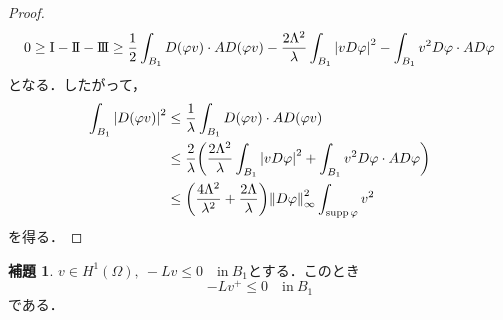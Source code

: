 \documentclass[a4paper]{ltjsarticle}
\newcommand{\Om}{\Omega}
\newcommand{\inn}{\quad\text{in}\ }
\newcommand{\one}{\mathrm{I}}
\newcommand{\two}{\mathrm{I}\hspace{-1.2pt}\mathrm{I}}
\newcommand{\three}{\mathrm{I}\hspace{-1.2pt}\mathrm{I}\hspace{-1.2pt}\mathrm{I}}
\newcommand{\1}{\mathbbm{1}}
\DeclareMathOperator{\supp}{\mathrm{supp}}
\numberwithin{equation}{section}
\theoremstyle{definition}
\newtheorem{lem}[thm]{補題}
\begin{document}
\begin{proof}
\begin{equation}
        0\geq \one-\two-\three\geq \frac{1}{2}\int_{B_1}D(\varphi v)\cdot AD(\varphi v)-\frac{2\Lambda^2}{\lambda}\int_{B_1}\abs{vD\varphi}^2-\int_{B_1}v^2D\varphi\cdot AD\varphi
    \end{equation}
    となる．したがって，
    \begin{align}
        \int_{B_1}\abs{D(\varphi v)}^2&\leq \frac{1}{\lambda}\int_{B_1}D(\varphi v)\cdot AD(\varphi v)\\
        &\leq \frac{2}{\lambda}\qty(\frac{2\Lambda^2}{\lambda}\int_{B_1}\abs{vD\varphi}^2+\int_{B_1}v^2D\varphi\cdot AD\varphi)\\
        &\leq\qty(\frac{4\Lambda^2}{\lambda^2}+\frac{2\Lambda}{\lambda})\norm{D\varphi}_\infty^2\int_{\supp\varphi}v^2
    \end{align}
    を得る．
\end{proof}
\begin{lem}\label{lem:pluspart}
    $v\in H^1(\Om),\ -Lv\leq0 \inn B_1$とする．このとき
    \begin{equation}
        -Lv^+\leq 0\inn B_1 
    \end{equation}
    である．
\end{lem}
\end{document}
